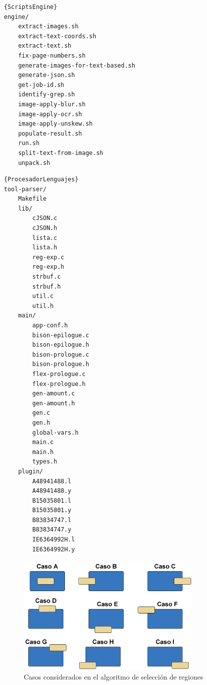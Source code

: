 \noindent\begin{minipage}{.45\textwidth}
\begin{lstlisting}[caption=Scripts del \emph{engine}]{ScriptsEngine}
engine/
    extract-images.sh
    extract-text-coords.sh
    extract-text.sh
    fix-page-numbers.sh
    generate-images-for-text-based.sh
    generate-json.sh
    get-job-id.sh
    identify-grep.sh
    image-apply-blur.sh
    image-apply-ocr.sh
    image-apply-unskew.sh
    populate-result.sh
    run.sh
    split-text-from-image.sh
    unpack.sh
\end{lstlisting}
\end{minipage}\hfill
\begin{minipage}{.45\textwidth}
\begin{lstlisting}[caption=Fuentes del procesador de lenguaje intermedio,label=lst:fuentes-del-procesador-de-lenguajes]{ProcesadorLenguajes}
tool-parser/
    Makefile
    lib/
        cJSON.c
        cJSON.h
        lista.c
        lista.h
        reg-exp.c
        reg-exp.h
        strbuf.c
        strbuf.h
        util.c
        util.h
    main/
        app-conf.h
        bison-epilogue.c
        bison-epilogue.h
        bison-prologue.c
        bison-prologue.h
        flex-prologue.c
        flex-prologue.h
        gen-amount.c
        gen-amount.h
        gen.c
        gen.h
        global-vars.h
        main.c
        main.h
        types.h
    plugin/
        A48941488.l
        A48941488.y
        B15035801.l
        B15035801.y
        B83834747.l
        B83834747.y
        IE6364992H.l
        IE6364992H.y
\end{lstlisting}
\end{minipage}

\begin{figure}[hp!]
    \centering
    \includegraphics[width=0.8\textwidth]{imaxes/z-adicional/casos-algoritmo-seleccion-regiones.png}
    \caption{Casos considerados en el algoritmo de selección de regiones}
    \label{fig:casos-algoritmo-seleccion-regiones}
\end{figure}

